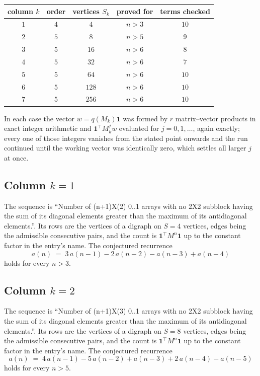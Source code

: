 \documentclass[11pt,a4paper]{article}
\theoremstyle{plain}
\theoremstyle{definition}
\begin{document}
\begin{center}
\begin{tabular}{ccccc}
column $k$ & order & vertices $S_k$ & proved for & terms checked \\ \hline
$1$ & $4$ & $4$ & $n>3$ & $10$ \\
$2$ & $5$ & $8$ & $n>5$ & $9$ \\
$3$ & $5$ & $16$ & $n>6$ & $8$ \\
$4$ & $5$ & $32$ & $n>6$ & $7$ \\
$5$ & $5$ & $64$ & $n>6$ & $10$ \\
$6$ & $5$ & $128$ & $n>6$ & $10$ \\
$7$ & $5$ & $256$ & $n>6$ & $10$ \\
\end{tabular}
\end{center}

In each case the vector $w=q(M_k)\mathbf{1}$ was formed by $r$ matrix--vector products in
exact integer arithmetic and $\mathbf{1}^{\!\top}M_k^{j}w$ evaluated for $j=0,1,\dots$,
again exactly; every one of those integers vanishes from the stated point onwards and the run
continued until the working vector was identically zero, which settles all larger $j$ at once.

\subsection*{Column $k=1$}
The sequence is ``Number of (n+1)X(2) 0..1 arrays with no 2X2 subblock having the sum of its diagonal elements greater than the maximum of its antidiagonal elements.''. Its rows are the vertices of a digraph on
$S=4$ vertices, edges being the admissible consecutive pairs, and the count is
$\mathbf{1}^{\!\top}M^{n}\mathbf{1}$ up to the constant factor in the entry's name.
The conjectured recurrence
\[
a(n)\;=\;3\,a(n-1) - 2\,a(n-2) - a(n-3) + a(n-4)
\]
holds for every $n>3$.

\subsection*{Column $k=2$}
The sequence is ``Number of (n+1)X(3) 0..1 arrays with no 2X2 subblock having the sum of its diagonal elements greater than the maximum of its antidiagonal elements.''. Its rows are the vertices of a digraph on
$S=8$ vertices, edges being the admissible consecutive pairs, and the count is
$\mathbf{1}^{\!\top}M^{n}\mathbf{1}$ up to the constant factor in the entry's name.
The conjectured recurrence
\[
a(n)\;=\;4\,a(n-1) - 5\,a(n-2) + a(n-3) + 2\,a(n-4) - a(n-5)
\]
holds for every $n>5$.
\end{document}
